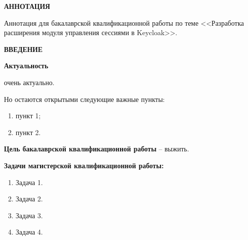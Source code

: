\newpage
\begin{center}
  \textbf{\large АННОТАЦИЯ}
\end{center}


Аннотация для бакалаврской квалификационной работы по теме <<Разработка расширения модуля управления сессиями в Keycloak>>.

\onehalfspacing
\setcounter{page}{2}

\newpage
\renewcommand{\contentsname}{\centerline{\large СОДЕРЖАНИЕ}}
\tableofcontents

\newpage
\begin{center}
  \textbf{\large ВВЕДЕНИЕ}
\end{center}


\textbf{Актуальность}

очень актуально.

Но остаются открытыми следующие важные пункты:
\begin{enumerate}
\item пункт 1;
\item пункт 2.
\end{enumerate}

\newpage

\textbf{Цель бакалаврской квалификационной работы} -- выжить.

\textbf{Задачи магистерской квалификационной работы:}
\begin{enumerate}
\item Задача 1. 
\item Задача 2.
\item Задача 3.
\item Задача 4. 
\end{enumerate}

